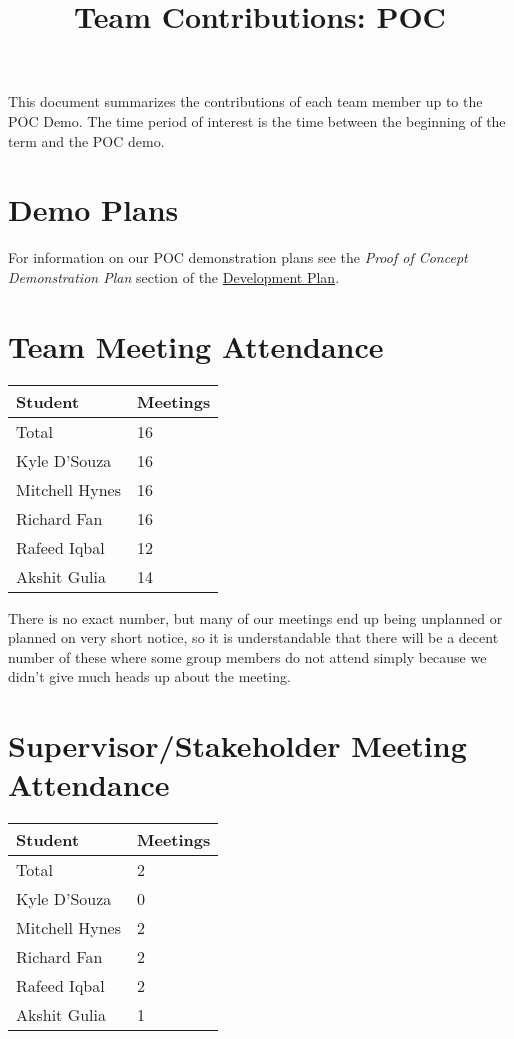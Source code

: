 \documentclass{article}
\title{Team Contributions: POC\\\progname}
\author{\authname}
\date{}
\begin{document}
\maketitle

This document summarizes the contributions of each team member up to the POC
Demo.  The time period of interest is the time between the beginning of the term
and the POC demo.

\section{Demo Plans}

For information on our POC demonstration plans see the \textit{Proof
of Concept Demonstration Plan} section of the
\href{https://github.com/Spitgranger/SyncMaster/blob/main/docs/DevelopmentPlan/DevelopmentPlan.pdf}{Development
Plan}.

\section{Team Meeting Attendance}

\begin{table}[H]
  \centering
  \begin{tabular}{ll}
    \toprule
    \textbf{Student} & \textbf{Meetings}\\
    \midrule
    Total & 16\\
    Kyle D'Souza & 16\\
    Mitchell Hynes & 16\\
    Richard Fan & 16\\
    Rafeed Iqbal & 12\\
    Akshit Gulia & 14\\
    \bottomrule
  \end{tabular}
\end{table}

There is no exact number, but many of our meetings end up being
unplanned or planned on very short notice, so it is understandable
that there will be a decent number of these where some group members
do not attend simply because we didn't give much heads up about the meeting.

\section{Supervisor/Stakeholder Meeting Attendance}

\begin{table}[H]
  \centering
  \begin{tabular}{ll}
    \toprule
    \textbf{Student} & \textbf{Meetings}\\
    \midrule
    Total & 2\\
    Kyle D'Souza & 0\\
    Mitchell Hynes & 2\\
    Richard Fan & 2\\
    Rafeed Iqbal & 2\\
    Akshit Gulia & 1\\
    \bottomrule
  \end{tabular}
\end{table}
\end{document}
